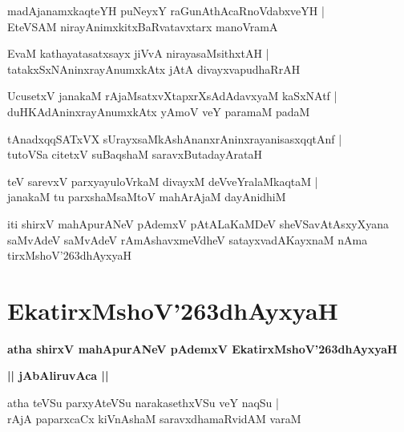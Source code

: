 \documentclass[twoside,12pt,openright]{book}
\def\S{\char'263}
\newcounter{shloka}[chapter]
\def\uvaca#1{\centerline{{\large\textbf{#1}}}}
\begin{document}
\begin{shloka}%
madAjanamxkaqteYH puNeyxY raGunAthAcaRnoVdabxveYH |\\
EteVSAM nirayAnimxkitxBaRvatavxtarx manoVramA 
\end{shloka}

\begin{shloka}%
EvaM kathayatasatxsayx jiVvA nirayasaMsithxtAH |\\
tatakxSxNAninxrayAnumxkAtx jAtA divayxvapudhaRrAH 
\end{shloka}

\begin{shloka}%
UcusetxV janakaM rAjaMsatxvXtapxrXsAdAdavxyaM kaSxNAtf |\\
duHKAdAninxrayAnumxkAtx yAmoV veY paramaM padaM 
\end{shloka}

\begin{shloka}%
tAnadxqqSATxVX sUrayxsaMkAshAnanxrAninxrayanisasxqqtAnf |\\
tutoVSa citetxV suBaqshaM saravxButadayArataH 
\end{shloka}

\begin{shloka}%
teV sarevxV parxyayuloVrkaM divayxM deVveYralaMkaqtaM |\\
janakaM tu parxshaMsaMtoV mahArAjaM dayAnidhiM 
\end{shloka}

\begin{center}
iti shirxV mahApurANeV pAdemxV pAtALaKaMDeV sheVSavAtAsxyXyana saMvAdeV 
saMvAdeV rAmAshavxmeVdheV satayxvadAKayxnaM nAma tirxMshoV\S dhAyxyaH
\end{center}

\chapter{EkatirxMshoV\S dhAyxyaH}

\begin{center}
{\LARGE\bfseries atha shirxV mahApurANeV pAdemxV EkatirxMshoV\S dhAyxyaH}
\end{center}

\uvaca{|| jAbAliruvAca ||}

\begin{shloka}%
atha teVSu parxyAteVSu narakasethxVSu veY naqSu |\\
rAjA paparxcaCx kiVnAshaM saravxdhamaRvidAM varaM 
\end{shloka}
\end{document}
